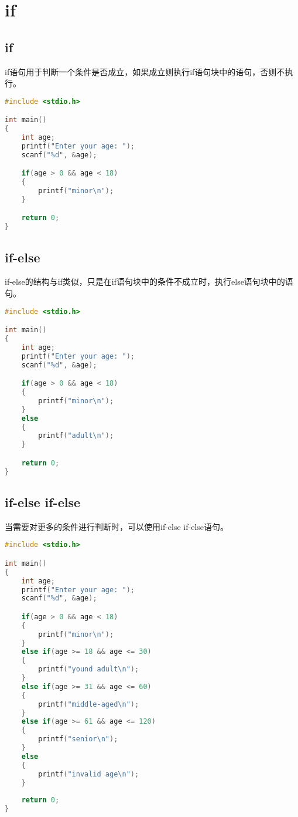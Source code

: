 \newpage

\section{if}

\subsection{if}

if语句用于判断一个条件是否成立，如果成立则执行if语句块中的语句，否则不执行。\\

\vspace{-1cm}

\begin{lstlisting}[language=C]
#include <stdio.h>

int main()
{
	int age;
	printf("Enter your age: ");
	scanf("%d", &age);

	if(age > 0 && age < 18)
	{
		printf("minor\n");
	}

	return 0;
}
\end{lstlisting}

\vspace{0.5cm}

\subsection{if-else}

if-else的结构与if类似，只是在if语句块中的条件不成立时，执行else语句块中的语句。

\begin{lstlisting}[language=C]
#include <stdio.h>

int main()
{
	int age;
	printf("Enter your age: ");
	scanf("%d", &age);

	if(age > 0 && age < 18)
	{
		printf("minor\n");
	}
	else
	{
		printf("adult\n");
	}

	return 0;
}
\end{lstlisting}

\vspace{0.5cm}

\subsection{if-else if-else}

当需要对更多的条件进行判断时，可以使用if-else if-else语句。

\begin{lstlisting}[language=C]
#include <stdio.h>

int main()
{
	int age;
	printf("Enter your age: ");
	scanf("%d", &age);

	if(age > 0 && age < 18)
	{
		printf("minor\n");
	}
	else if(age >= 18 && age <= 30)
	{
		printf("yound adult\n");
	}
	else if(age >= 31 && age <= 60)
	{
		printf("middle-aged\n");
	}
	else if(age >= 61 && age <= 120)
	{
		printf("senior\n");
	}
	else
	{
		printf("invalid age\n");
	}
	
	return 0;
}
\end{lstlisting}


